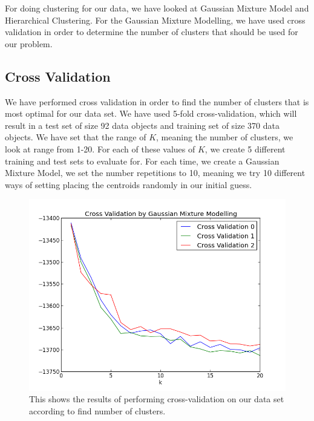 For doing clustering for our data, we have looked at Gaussian Mixture Model and Hierarchical Clustering. For the Gaussian Mixture Modelling, we have used cross validation in order to determine the number of clusters that should be used for our problem.


\subsection{Cross Validation}

We have performed cross validation in order to find the number of clusters that is most optimal for our data set. We have used 5-fold cross-validation, which will result in a test set of size 92 data objects and training set of size 370 data objects. We have set that the range of $K$, meaning the number of clusters, we look at range from 1-20. For each of these values of $K$, we create 5 different training and test sets to evaluate for. For each time, we create a Gaussian Mixture Model, we set the number repetitions to 10, meaning we try 10 different ways of setting placing the centroids randomly in our initial guess.

\begin{figure}[h]
\includegraphics[scale=0.5]{pictures/CVKGaussian.png}
\caption{This shows the results of performing cross-validation on our data set according to find number of clusters.}
\label{CVK}
\end{figure}

